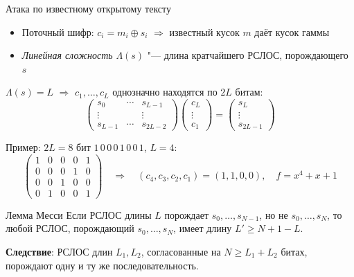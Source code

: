 \documentclass{ca-slides}
\begin{document}
\begin{canvasframe}[shrink=14]{Атака по известному открытому тексту}
  \begin{itemize}
    \item Поточный шифр: $c_i = m_i \oplus s_i$ $\Rightarrow$ известный кусок $m$ даёт кусок гаммы
    \item \emph{Линейная сложность} $\Lambda(s)$ "--- длина кратчайшего РСЛОС, порождающего $s$
  \end{itemize}
  \begin{proposition}
    $\Lambda(s) = L$ $\Rightarrow$ $c_1, \dots, c_L$ однозначно находятся по $2L$ битам:
    \[\begin{pmatrix}
      s_0 & \cdots & s_{L-1}\\ \vdots & & \vdots\\ s_{L-1} & \cdots & s_{2L-2}
    \end{pmatrix}
    \begin{pmatrix} c_L\\ \vdots\\ c_1\end{pmatrix} =
    \begin{pmatrix} s_L\\ \vdots\\ s_{2L-1}\end{pmatrix}\]
  \end{proposition}
\end{canvasframe}

\begin{canvasframe}{Пример: $2L = 8$ бит}
  $1\,0\,0\,0\,1\,0\,0\,1$, \quad $L = 4$:
  \[\left(\begin{array}{cccc|c}
    1 & 0 & 0 & 0 & 1\\
    0 & 0 & 0 & 1 & 0\\
    0 & 0 & 1 & 0 & 0\\
    0 & 1 & 0 & 0 & 1
  \end{array}\right)
  \quad\Rightarrow\quad (c_4, c_3, c_2, c_1) = (1, 1, 0, 0),\quad f = x^4 + x + 1\]
  \notearea[0.3\textheight]
\end{canvasframe}

\begin{theoremframe}[lemma]{Лемма Месси}
  Если РСЛОС длины $L$ порождает $s_0, \dots, s_{N-1}$, но не $s_0, \dots, s_N$, то любой РСЛОС,
  порождающий $s_0, \dots, s_N$, имеет длину $L' \ge N + 1 - L$.

  \smallskip
  \textbf{Следствие}: РСЛОС длин $L_1, L_2$, согласованные на $N \ge L_1 + L_2$ битах, порождают
  одну и ту же последовательность.
\end{theoremframe}
\end{document}
